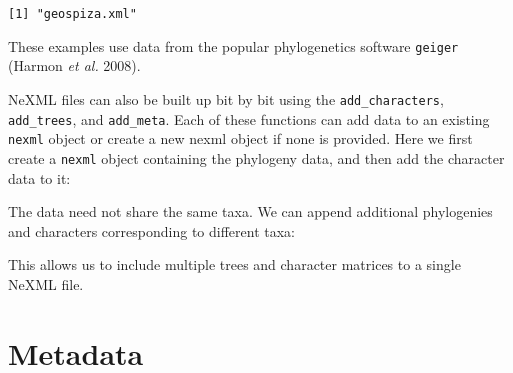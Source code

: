 \documentclass[author-year, review, 11pt]{components/elsarticle} %
\newenvironment{Shaded}{\begin{snugshade}}{\end{snugshade}}
\newcommand{\KeywordTok}[1]{\textcolor[rgb]{0.13,0.29,0.53}{\textbf{{#1}}}}
\newcommand{\DataTypeTok}[1]{\textcolor[rgb]{0.13,0.29,0.53}{{#1}}}
\newcommand{\StringTok}[1]{\textcolor[rgb]{0.31,0.60,0.02}{{#1}}}
\newcommand{\NormalTok}[1]{{#1}}
\begin{document}
\begin{Shaded}
\end{Shaded}

\begin{verbatim}
[1] "geospiza.xml"
\end{verbatim}

These examples use data from the popular phylogenetics software
\texttt{geiger} (Harmon \emph{et al.} 2008).

NeXML files can also be built up bit by bit using the
\texttt{add\_characters}, \texttt{add\_trees}, and \texttt{add\_meta}.
Each of these functions can add data to an existing \texttt{nexml}
object or create a new nexml object if none is provided. Here we first
create a \texttt{nexml} object containing the phylogeny data, and then
add the character data to it:

\begin{Shaded}
\end{Shaded}

The data need not share the same taxa. We can append additional
phylogenies and characters corresponding to different taxa:

\begin{Shaded}
\end{Shaded}

This allows us to include multiple trees and character matrices to a
single NeXML file.

\section{Metadata}\label{metadata}
\end{document}
